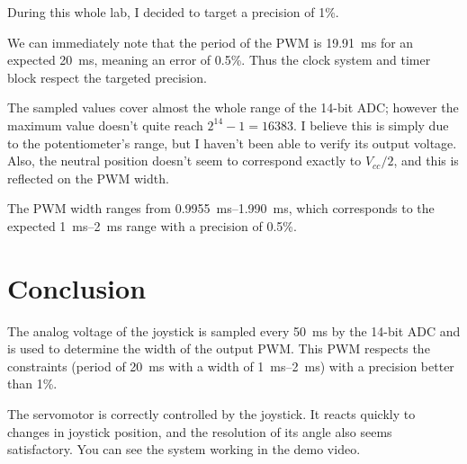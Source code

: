 \documentclass[12pt,a4paper]{article}
\begin{document}
During this whole lab, I decided to target a precision of 1\%.

We can immediately note that the period of the PWM is \SI{19.91}{\milli\s} for an expected \SI{20}{\milli\s}, meaning an error of 0.5\%. Thus the clock system and timer block respect the targeted precision.

The sampled values cover almost the whole range of the 14-bit ADC; however the maximum value doesn't quite reach $2^{14}-1 = 16383$. I believe this is simply due to the potentiometer's range, but I haven't been able to verify its output voltage. Also, the neutral position doesn't seem to correspond exactly to $V_{cc}/2$, and this is reflected on the PWM width.

The PWM width ranges from \SIrange{0.9955}{1.990}{\milli\s}, which corresponds to the expected \SIrange{1}{2}{\milli\s} range with a precision of 0.5\%.

\section{Conclusion}

The analog voltage of the joystick is sampled every \SI{50}{\milli\s} by the 14-bit ADC and is used to determine the width of the output PWM. This PWM respects the constraints (period of \SI{20}{\milli\s} with a width of \SIrange[range-phrase=--,range-units=single]{1}{2}{\milli\s}) with a precision better than 1\%.

The servomotor is correctly controlled by the joystick. It reacts quickly to changes in joystick position, and the resolution of its angle also seems satisfactory. You can see the system working in the demo video.
\end{document}
